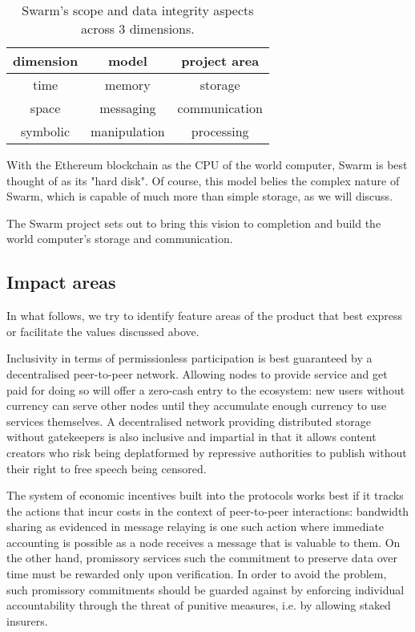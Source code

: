 \begin{table}[htb]
\centering
\begin{tabular}{c|c|c}
dimension & model & project area\\\hline
%
time & memory & storage \\
space & messaging & communication \\
symbolic & manipulation & processing \\
\end{tabular}
\caption{Swarm's scope and data integrity aspects across 3 dimensions.}
\label{tab:scope}
\end{table}

 
With the Ethereum blockchain as the CPU of the world computer, Swarm is best thought of as its "hard disk". Of course, this model belies the complex nature of Swarm, which is capable of much more than simple storage, as we will discuss.

The Swarm project sets out to bring this vision to completion and build the world computer's storage and communication. 

\subsection{Impact areas \statusorange}

In what follows, we try to identify feature areas of the product that best express or facilitate the values discussed above. 

Inclusivity in terms of permissionless participation is best guaranteed by a decentralised peer-to-peer network.  
Allowing nodes to provide service and get paid for doing so will offer a zero-cash entry to the ecosystem: new users without currency can serve other nodes until they accumulate enough currency to use services themselves. A decentralised network providing distributed storage without gatekeepers is also inclusive and impartial in that it allows content creators who risk being deplatformed by repressive  authorities to publish without their right to free speech being censored. 

The system of economic incentives built into the protocols works best if it tracks the actions that incur costs in the context of peer-to-peer interactions: bandwidth sharing as evidenced in message relaying is one such action where immediate accounting is possible as a node receives a message that is valuable to them. On the other hand, promissory services such the commitment to preserve data over time must be rewarded only upon verification. In order to avoid the  problem, such promissory commitments should be guarded against by enforcing individual accountability through the threat of punitive measures, i.e. by allowing staked insurers.

